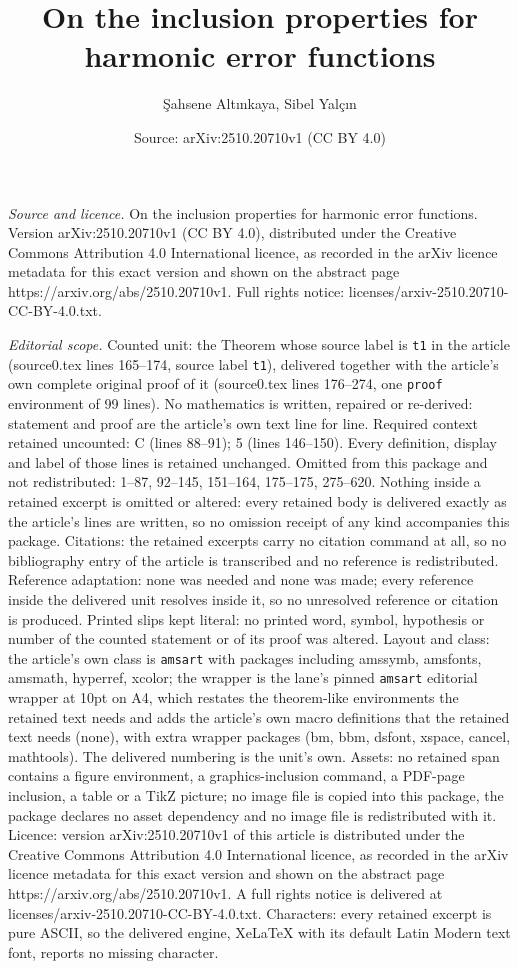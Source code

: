 \documentclass[10pt,a4paper]{amsart}
\title[On the inclusion properties for harmonic error functions]{On the inclusion properties for harmonic error functions}
\author{\c{S}ahsene Alt{\i}nkaya, Sibel Yal\c{c}{\i}n}
\date{Source: arXiv:2510.20710v1 (CC BY 4.0)}
\begin{document}
\maketitle

\noindent\emph{Source and licence.} On the inclusion properties for harmonic error functions. Version arXiv:2510.20710v1 (CC BY 4.0), distributed under the Creative Commons Attribution 4.0 International licence, as recorded in the arXiv licence metadata for this exact version and shown on the abstract page https://arxiv.org/abs/2510.20710v1. Full rights notice: licenses/arxiv-2510.20710-CC-BY-4.0.txt.\par\smallskip

\noindent\textit{Editorial scope.} Counted unit: the Theorem whose source label is \texttt{t1} in the article (source0.tex lines 165--174, source label \texttt{t1}), delivered together with the article's own complete original proof of it (source0.tex lines 176--274, one \texttt{proof} environment of 99 lines). No mathematics is written, repaired or re-derived: statement and proof are the article's own text line for line. Required context retained uncounted: C (lines 88--91); 5 (lines 146--150). Every definition, display and label of those lines is retained unchanged. Omitted from this package and not redistributed: 1--87, 92--145, 151--164, 175--175, 275--620. Nothing inside a retained excerpt is omitted or altered: every retained body is delivered exactly as the article's lines are written, so no omission receipt of any kind accompanies this package. Citations: the retained excerpts carry no citation command at all, so no bibliography entry of the article is transcribed and no reference is redistributed. Reference adaptation: none was needed and none was made; every reference inside the delivered unit resolves inside it, so no unresolved reference or citation is produced. Printed slips kept literal: no printed word, symbol, hypothesis or number of the counted statement or of its proof was altered. Layout and class: the article's own class is \texttt{amsart} with packages including amssymb, amsfonts, amsmath, hyperref, xcolor; the wrapper is the lane's pinned \texttt{amsart} editorial wrapper at 10pt on A4, which restates the theorem-like environments the retained text needs and adds the article's own macro definitions that the retained text needs (none), with extra wrapper packages (bm, bbm, dsfont, xspace, cancel, mathtools). The delivered numbering is the unit's own. Assets: no retained span contains a figure environment, a graphics-inclusion command, a PDF-page inclusion, a table or a TikZ picture; no image file is copied into this package, the package declares no asset dependency and no image file is redistributed with it. Licence: version arXiv:2510.20710v1 of this article is distributed under the Creative Commons Attribution 4.0 International licence, as recorded in the arXiv licence metadata for this exact version and shown on the abstract page https://arxiv.org/abs/2510.20710v1. A full rights notice is delivered at licenses/arxiv-2510.20710-CC-BY-4.0.txt. Characters: every retained excerpt is pure ASCII, so the delivered engine, XeLaTeX with its default Latin Modern text font, reports no missing character.
\end{document}
